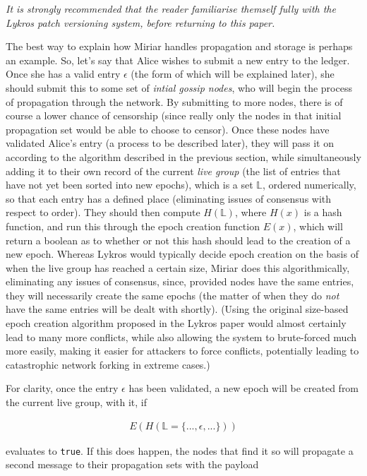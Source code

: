 \documentclass{extreport}
\begin{document}
\emph{It is strongly recommended that the reader familiarise themself fully with the Lykros patch versioning system, before returning to this paper.}

The best way to explain how Miriar handles propagation and storage is perhaps an example. So, let's say that Alice wishes to submit a new entry to the ledger. Once she has a valid entry \(\epsilon\) (the form of which will be explained later), she should submit this to some set of \emph{intial gossip nodes}, who will begin the process of propagation through the network. By submitting to more nodes, there is of course a lower chance of censorship (since really only the nodes in that initial propagation set would be able to choose to censor). Once these nodes have validated Alice's entry (a process to be described later), they will pass it on according to the algorithm described in the previous section, while simultaneously adding it to their own record of the current \emph{live group} (the list of entries that have not yet been sorted into new epochs), which is a set \(\mathbb{L}\), ordered numerically, so that each entry has a defined place (eliminating issues of consensus with respect to order). They should then compute \(H(\mathbb{L})\), where \(H(x)\) is a hash function, and run this through the epoch creation function \(E(x)\), which will return a boolean as to whether or not this hash should lead to the creation of a new epoch. Whereas Lykros would typically decide epoch creation on the basis of when the live group has reached a certain size, Miriar does this algorithmically, eliminating any issues of consensus, since, provided nodes have the same entries, they will necessarily create the same epochs (the matter of when they do \emph{not} have the same entries will be dealt with shortly). (Using the original size-based epoch creation algorithm proposed in the Lykros paper would almost certainly lead to many more conflicts, while also allowing the system to brute-forced much more easily, making it easier for attackers to force conflicts, potentially leading to catastrophic network forking in extreme cases.)

For clarity, once the entry \(\epsilon\) has been validated, a new epoch will be created from the current live group, with it, if

\begin{align*}
E( H( \mathbb{L} = \{ ..., \epsilon, ... \} ) ) \tag{3.1}
\end{align*}

evaluates to \texttt{true}. If this does happen, the nodes that find it so will propagate a second message to their propagation sets with the payload
\end{document}
